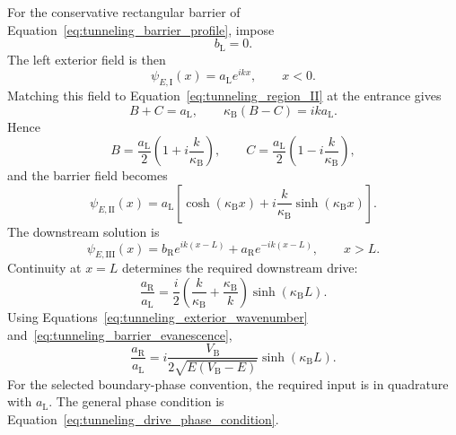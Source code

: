 For the conservative rectangular barrier of Equation~\eqref{eq:tunneling_barrier_profile}, impose
\begin{equation}
    b_{\mathrm L}=0.
    \label{eq:tunneling_active_zero_reflection}
\end{equation}
The left exterior field is then
\begin{equation}
    \psi_{E,\mathrm I}(x)=a_{\mathrm L}e^{ikx},
    \qquad x<0.
    \label{eq:tunneling_active_left_field}
\end{equation}
Matching this field to Equation~\eqref{eq:tunneling_region_II} at the entrance gives
\begin{equation}
    B+C=a_{\mathrm L},
    \qquad
    \kappa_{\mathrm B}(B-C)=ik a_{\mathrm L}.
\end{equation}
Hence
\begin{equation}
    B=\frac{a_{\mathrm L}}2
    \left(1+i\frac{k}{\kappa_{\mathrm B}}\right),
    \qquad
    C=\frac{a_{\mathrm L}}2
    \left(1-i\frac{k}{\kappa_{\mathrm B}}\right),
\end{equation}
and the barrier field becomes
\begin{equation}
    \boxed{
    \psi_{E,\mathrm{II}}(x)
    =a_{\mathrm L}\left[
        \cosh(\kappa_{\mathrm B}x)
        +i\frac{k}{\kappa_{\mathrm B}}
        \sinh(\kappa_{\mathrm B}x)
    \right]
    }.
    \label{eq:tunneling_active_barrier_field}
\end{equation}
The downstream solution is
\begin{equation}
    \psi_{E,\mathrm{III}}(x)
    =b_{\mathrm R}e^{ik(x-L)}
    +a_{\mathrm R}e^{-ik(x-L)},
    \qquad x>L.
    \label{eq:tunneling_active_right_field}
\end{equation}
Continuity at $x=L$ determines the required downstream drive:
\begin{equation}
    \frac{a_{\mathrm R}}{a_{\mathrm L}}
    =\frac{i}{2}
    \left(\frac{k}{\kappa_{\mathrm B}}
    +\frac{\kappa_{\mathrm B}}{k}\right)
    \sinh(\kappa_{\mathrm B}L).
    \label{eq:tunneling_active_drive_exact}
\end{equation}
Using Equations~\eqref{eq:tunneling_exterior_wavenumber} and~\eqref{eq:tunneling_barrier_evanescence},
\begin{equation}
    \boxed{
    \frac{a_{\mathrm R}}{a_{\mathrm L}}
    =i\frac{V_{\mathrm B}}{2\sqrt{E(V_{\mathrm B}-E)}}
    \sinh(\kappa_{\mathrm B}L)
    }.
    \label{eq:tunneling_active_drive_engineering}
\end{equation}
For the selected boundary-phase convention, the required input is in quadrature with $a_{\mathrm L}$. The general phase condition is Equation~\eqref{eq:tunneling_drive_phase_condition}.

